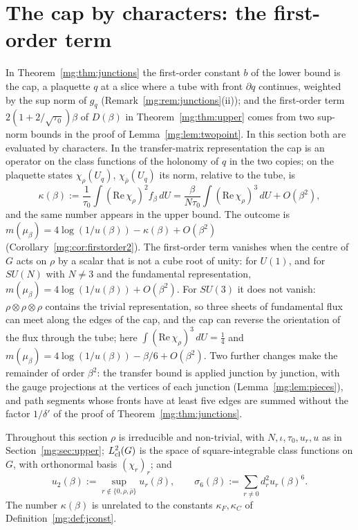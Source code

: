 \documentclass[11pt,a4paper]{article}
\theoremstyle{definition}
\theoremstyle{remark}
\newcommand{\dU}{\,dU}
\begin{document}
\section{The cap by characters: the first-order term}\label{mg:sec:cap}

In Theorem~\ref{mg:thm:junctions} the first-order constant $b$ of the lower bound is the cap, a plaquette $q$ at a slice where a tube with front
$\partial q$ continues, weighted by the sup norm of $g_q$ (Remark~\ref{mg:rem:junctions}(ii)); and the first-order term $2(1+2/\sqrt{\tau_0})\beta$ of
$D(\beta)$ in Theorem~\ref{mg:thm:upper} comes from two sup-norm bounds in the proof of Lemma~\ref{mg:lem:twopoint}. In this section both are
evaluated by characters. In the transfer-matrix representation the cap is an operator on the class functions of the holonomy of $q$ in the two
copies; on the plaquette states $\chi_\rho(U_q)$, $\chi_{\bar\rho}(U_q)$ its norm, relative to the tube, is
\[
\kappa(\beta):=\frac1{\tau_0}\int(\mathrm{Re}\,\chi_\rho)^2f_\beta\dU=\frac\beta{N\tau_0}\int(\mathrm{Re}\,\chi_\rho)^3\dU+O(\beta^2),
\]
and the same number appears in the upper bound. The outcome is $m(\mu_\beta)=4\log(1/u(\beta))-\kappa(\beta)+O(\beta^2)$
(Corollary~\ref{mg:cor:firstorder2}). The first-order term vanishes when the centre of $G$ acts on $\rho$ by a scalar that is not a cube
root of unity: for $U(1)$, and for $SU(N)$ with $N\ne3$ and the fundamental representation, $m(\mu_\beta)=4\log(1/u(\beta))+O(\beta^2)$. For
$SU(3)$ it does not vanish: $\rho\otimes\rho\otimes\rho$ contains the trivial representation, so three sheets of fundamental flux can meet along
the edges of the cap, and the cap can reverse the orientation of the flux through the tube; here $\int(\mathrm{Re}\,\chi_\rho)^3\dU=\frac14$ and
$m(\mu_\beta)=4\log(1/u(\beta))-\beta/6+O(\beta^2)$. Two further changes make the remainder of order $\beta^2$: the transfer bound is applied
junction by junction, with the gauge projections at the vertices of each junction (Lemma~\ref{mg:lem:pieces}), and path segments whose fronts
have at least five edges are summed without the factor $1/\delta'$ of the proof of Theorem~\ref{mg:thm:junctions}.

Throughout this section $\rho$ is irreducible and non-trivial, with $N,\iota,\tau_0,u_r,u$ as in Section~\ref{mg:sec:upper};
$L^2_{\rm cl}(G)$ is the space of square-integrable class functions on $G$, with orthonormal basis $(\chi_r)_r$; and
\[
u_2(\beta):=\sup_{r\notin\{0,\rho,\bar\rho\}}u_r(\beta),\qquad\sigma_6(\beta):=\sum_{r\neq0}d_r^2u_r(\beta)^6 .
\]
The number $\kappa(\beta)$ is unrelated to the constants $\kappa_F,\kappa_C$ of Definition~\ref{mg:def:jconst}.
\end{document}
